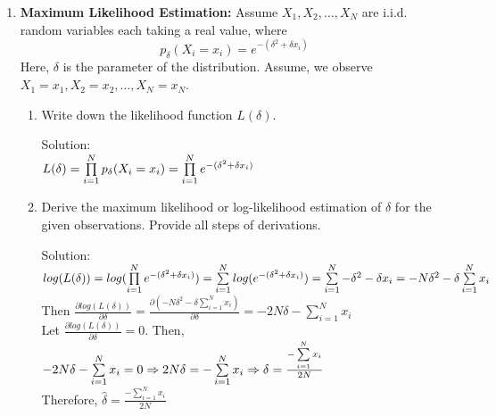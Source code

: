 \documentclass[12pt]{article}
\newcommand{\solu}{{\color{blue} Solution:}}
\newcommand{\indep}{\perp \!\!\! \perp}
\begin{document}
\begin{enumerate}
\begin{enumerate}
            \solu \ This is \textbf{True}
            \begin{proof}
                $X \indep Y \Rightarrow P(XY) = P(X)P(Y)$\\
                $E(XY) \\
                = \sum xyP(XY) \\
                = \sum xyP(X)P(Y)\\
                = \sum xP(X) \sum yP(Y)\\
                = E[X]E[Y]$
            \end{proof}
        \end{enumerate}

        \item \textbf{Maximum Likelihood Estimation:} Assume $X_1, X_2, \dots, X_N$ are i.i.d. random variables each taking a real value, where
        $$p_\delta(X_i = x_i) = e^{-(\delta^2+\delta x_i)}$$
        Here, $\delta$ is the parameter of the distribution. Assume, we observe $X_1 = x_1, X_2 = x_2, \dots, X_N = x_N$.
        \begin{enumerate}
            \item Write down the likelihood function $L(\delta)$.
            
            \solu \\
            $L(\delta) = \prod\limits_{i = 1}^{N}p_\delta(X_i = x_i) \\
            = \prod\limits_{i = 1}^{N}e^{-(\delta^2+\delta x_i)} $

            \item Derive the maximum likelihood or log-likelihood estimation of $\delta$ for the given observations. Provide all steps of derivations.
            
            \solu \\
            $log(L(\delta)) = log(\prod\limits_{i = 1}^{N} e^{-(\delta^2+\delta x_i)}) \\
            = \sum\limits_{i = 1}^{N} log(e^{-(\delta^2+\delta x_i)})\\
            = \sum\limits_{i = 1}^{N} -\delta^2-\delta x_i\\
            = -N\delta^2 - \delta\sum\limits_{i = 1}^{N}x_i$\\
            Then $\frac{\partial log(L(\delta))}{\partial \delta} 
            = \frac{\partial( -N\delta^2 - \delta\sum\limits_{i = 1}^{N}x_i)}{\partial \delta}
            = -2N\delta - \sum\limits_{i = 1}^{N}x_i$\\
            Let $\frac{\partial log(L(\delta))}{\partial \delta} = 0$.
            Then, $-2N\delta - \sum\limits_{i = 1}^{N}x_i = 0\\
            \Rightarrow 2N\delta = -\sum\limits_{i = 1}^{N}x_i
            \Rightarrow \delta = \frac{-\sum\limits_{i = 1}^{N}x_i}{2N}$\\
            Therefore, $\hat{\delta} = \frac{-\sum\limits_{i = 1}^{N}x_i}{2N}$
        \end{enumerate}


\end{enumerate}
\end{document}
